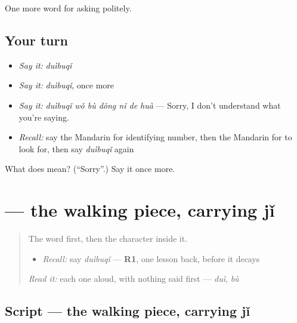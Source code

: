 \begin{grammarlens}[title={What you've built}]
One more word for asking politely.
\end{grammarlens}

\subsection*{Your turn}
\begin{itemize}
\raggedright
  \item \emph{Say it:} \emph{duìbuqǐ}
  \item \emph{Say it:} \emph{duìbuqǐ}, once more
  \item \emph{Say it:} \emph{duìbuqǐ wǒ bù dǒng nǐ de huà} — Sorry, I don't understand what you're saying.
  \item \emph{Recall:} say the Mandarin for identifying number, then the Mandarin for to look for, then say \emph{duìbuqǐ} again
\end{itemize}

\begin{tcolorbox}[breakable,colback=teal!4,colframe=teal!35!black,title={Before you move on}]
What does  mean? (\textquotedblleft{}Sorry\textquotedblright{}.) Say it once more.
\end{tcolorbox}
\section[\texorpdfstring{\zh{起} (qǐ)}{起 (qǐ)}]{ — the walking piece, carrying jǐ}

\label{lesson:ZH-W64-qi-rise}



\begin{quote}
The word first, then the character inside it.

\begin{itemize}
\raggedright
  \item \emph{Recall:} say \emph{duìbuqǐ} — \textbf{R1}, one lesson back, before it decays
\end{itemize}

\begin{quote}
 
\end{quote}

\emph{Read it:} each one aloud, with nothing said first — \emph{duì}, \emph{bù}
\end{quote}

\subsection*{Script — the walking piece, carrying jǐ}

